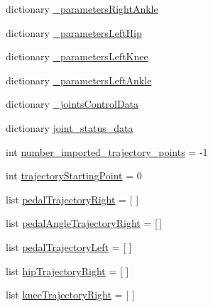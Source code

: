 \begin{DoxyCompactItemize}
\item 
dictionary \mbox{\hyperlink{namespacepedal__simulation__interpolation__lennard_a2344ad01ad871942e95974c840476636}{\+\_\+parameters\+Right\+Ankle}}
\item 
dictionary \mbox{\hyperlink{namespacepedal__simulation__interpolation__lennard_adbc8c1d48608d49593f53abd6b081bcd}{\+\_\+parameters\+Left\+Hip}}
\item 
dictionary \mbox{\hyperlink{namespacepedal__simulation__interpolation__lennard_a15ebaefa1e294fd8fcfcd1757c609710}{\+\_\+parameters\+Left\+Knee}}
\item 
dictionary \mbox{\hyperlink{namespacepedal__simulation__interpolation__lennard_a4fcc2a8d3c7e63760c2fad5bcaa96028}{\+\_\+parameters\+Left\+Ankle}}
\item 
dictionary \mbox{\hyperlink{namespacepedal__simulation__interpolation__lennard_a3f49ea6545158a29067f23151f804d05}{\+\_\+joints\+Control\+Data}}
\item 
dictionary \mbox{\hyperlink{namespacepedal__simulation__interpolation__lennard_a452347a99d9bff87737ddb94350081c3}{joint\+\_\+status\+\_\+data}}
\item 
int \mbox{\hyperlink{namespacepedal__simulation__interpolation__lennard_a2e564c7f90e42efb5db98ea04bf643a2}{number\+\_\+imported\+\_\+trajectory\+\_\+points}} = -\/1
\item 
int \mbox{\hyperlink{namespacepedal__simulation__interpolation__lennard_a512ee2b5ae089f50ef79f662f5dcd9d7}{trajectory\+Starting\+Point}} = 0
\item 
list \mbox{\hyperlink{namespacepedal__simulation__interpolation__lennard_a665c72fe3699574ecc5b9511425c9788}{pedal\+Trajectory\+Right}} = \mbox{[} \mbox{]}
\item 
list \mbox{\hyperlink{namespacepedal__simulation__interpolation__lennard_a456862740fa0ad18fad0f53b0ee8b0e9}{pedal\+Angle\+Trajectory\+Right}} = \mbox{[}$\,$\mbox{]}
\item 
list \mbox{\hyperlink{namespacepedal__simulation__interpolation__lennard_a578a0229cbc6c813469e7960453be829}{pedal\+Trajectory\+Left}} = \mbox{[} \mbox{]}
\item 
list \mbox{\hyperlink{namespacepedal__simulation__interpolation__lennard_a8d0095e7258850eb267921ec17fffba4}{hip\+Trajectory\+Right}} = \mbox{[} \mbox{]}
\item 
list \mbox{\hyperlink{namespacepedal__simulation__interpolation__lennard_a02f4cbf326e10f6874b86130f85ba156}{knee\+Trajectory\+Right}} = \mbox{[} \mbox{]}
\item 

\end{DoxyCompactItemize}
